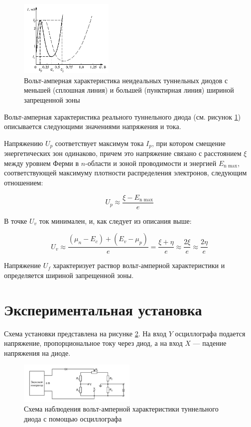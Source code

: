 \documentclass[a4paper,12pt]{article} %
\begin{document}
	\begin{figure}[h]
		\centering	
		\includegraphics[width=0.4\textwidth]{not_ideal.png}
		\caption{Вольт-амперная характеристика неидеальных туннельных диодов с меньшей (сплошная линия) и большей (пунктирная линия) шириной запрещенной зоны}
		\label{pic:not_ideal}
	\end{figure}  
	
	Вольт-амперная характеристика реального туннельного диода (см. рисунок \ref{pic:not_ideal}) описывается следующими значениями напряжения и тока. 
	
	Напряжению $U_p$ соответствует максимум тока $I_p$, при котором смещение энергетических зон одинаково, причем это напряжение связано с расстоянием $\xi$ между уровнем Ферми в $n$-области и зоной проводимости и энергией $E_\text{n max}$, соответствующей максимуму плотности распределения электронов, следующим отношением: 
	
	\[ U_p \approx \frac{\xi - E_\text{n max}}{e} \]
	
	В точке $U_v$ ток минимален, и, как следует из описания выше:
	
	\[ U_v \approx \frac{(\mu_n - E_c) + (E_v - \mu_p)}{e} = \frac{\xi + \eta}{e} \approx \frac{2\xi}{e} \approx \frac{2\eta}{e} \]
	
	Напряжение $U_f$ характеризует раствор вольт-амперной характеристики и определяется шириной запрещенной зоны. 


\section{Экспериментальная установка}
	
	Схема установки представлена на рисунке \ref{pic:scheme_oscil}. На вход $ Y $ осциллографа подается напряжение, пропорциональное току через диод, а на вход $ X $ --- падение напряжения на диоде.
	
	\begin{figure}[h]
		\centering	
		\includegraphics[width=0.5\textwidth]{scheme_oscil.png}
		\caption{Схема наблюдения вольт-амперной характеристики туннельного диода с помощью осциллографа}
		\label{pic:scheme_oscil}
	\end{figure}
	
\end{document}
